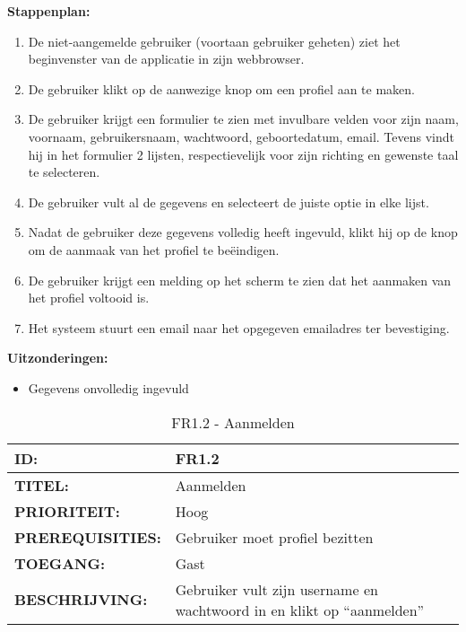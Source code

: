 \textbf{Stappenplan:}
\begin{enumerate}
\item De niet-aangemelde gebruiker (voortaan gebruiker geheten) ziet het beginvenster van de applicatie in zijn webbrowser.
\item De gebruiker klikt op de aanwezige knop om een profiel aan te maken.
\item De gebruiker krijgt een formulier te zien met invulbare velden voor zijn naam, voornaam, gebruikersnaam, wachtwoord, geboortedatum, email. Tevens vindt hij in het formulier 2 lijsten, respectievelijk voor zijn richting en gewenste taal te selecteren.
\item De gebruiker vult al de gegevens en selecteert de juiste optie in elke lijst.
\item Nadat de gebruiker deze gegevens volledig heeft ingevuld, klikt hij op de knop om de aanmaak van het profiel te beëindigen.
\item De gebruiker krijgt een melding op het scherm te zien dat het aanmaken van het profiel voltooid is.
\item Het systeem stuurt een email naar het opgegeven emailadres ter bevestiging.
\end{enumerate}

\textbf{Uitzonderingen:}
\begin{itemize}
\item Gegevens onvolledig ingevuld
\end{itemize}

\noindent\begin{table}[H]
            \begin{tabular}{l | p{10cm}}
                \textbf{ID:} & FR1.2 \\ \hline
                \textbf{TITEL:} & Aanmelden \\ \hline
                \textbf{PRIORITEIT:} &  Hoog \\ \hline
                \textbf{PREREQUISITIES:} & Gebruiker moet profiel bezitten\\ \hline
                \textbf{TOEGANG:} &  Gast \\ \hline
                \textbf{BESCHRIJVING:} & Gebruiker vult zijn username en wachtwoord in en klikt op “aanmelden”\\
            \end{tabular}
            \caption{FR1.2 - Aanmelden}
            \label{tab:FR1.2 - Aanmelden}
        \end{table}
        
